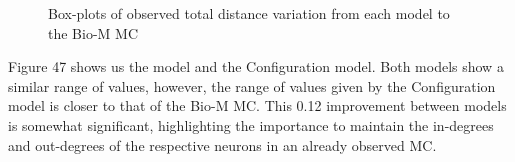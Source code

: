 \begin{figure}[H]%
    \centering
    \captionsetup{justification=centering}
    \qquad
    \caption{Box-plots of observed total distance variation from each model to the Bio-M MC}%
    \label{fig:example}%
\end{figure}
Figure 47 shows us the \ER model and the Configuration model. Both models show a similar range of values, however, the range of values given by the Configuration model is closer to that of the Bio-M MC. This 0.12 improvement between models is somewhat significant, highlighting the importance to maintain the in-degrees and out-degrees of the respective neurons in an already observed MC. 

